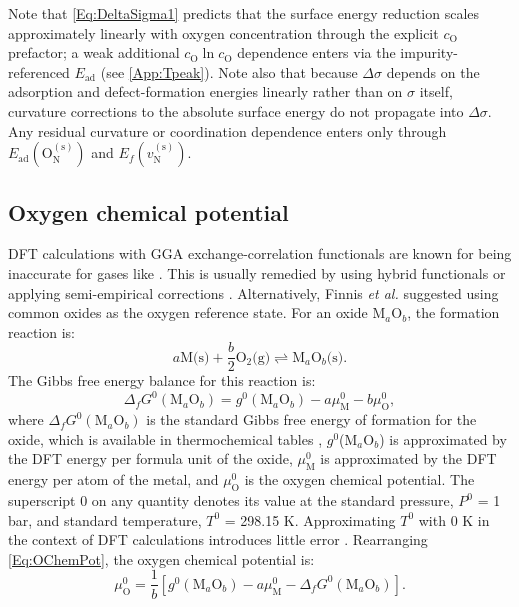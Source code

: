 \documentclass[preprint,12pt,sort&compress]{elsarticle}
\newcommand{\?}{\stackrel{?}{=}}
\begin{document}
Note that \cref{Eq:DeltaSigma1} predicts that the surface energy reduction scales approximately linearly with oxygen concentration through the explicit $c_\text{O}$ prefactor; a weak additional $c_\text{O}\ln c_\text{O}$ dependence enters via the impurity-referenced $E_\text{ad}$ (see \ref{App:Tpeak}). Note also that because $\Delta \sigma$ depends on the adsorption and defect-formation energies linearly rather than on $\sigma$ itself, curvature corrections to the absolute surface energy do not propagate into $\Delta \sigma$. Any residual curvature or coordination dependence enters only through $E_\text{ad}(\text{O}_\text{N}^{(\text{s})})$ and $E_f(v_\text{N}^{(\text{s})})$.

\subsection{Oxygen chemical potential}
\label{Sec:uO}

DFT calculations with GGA exchange-correlation functionals are known for being inaccurate for gases like  \cite{Bocharov2013}. This is usually remedied by using hybrid functionals or applying semi-empirical corrections \cite{Sargeant2021}. Alternatively, Finnis \textit{et al.} \cite{Finnis2005} suggested using common oxides as the oxygen reference state. For an oxide M$_a$O$_b$, the formation reaction is:
\begin{equation}
a \text{M(s)} + \frac{b}{2} \text{O$_2$(g)} \rightleftharpoons \text{M$_a$O$_b$(s)}.
\end{equation}
The Gibbs free energy balance for this reaction is:
\begin{equation}
\Delta_f G^0 (\text{M$_a$O$_b$}) = g^0(\text{M$_a$O$_b$}) - a \mu_\text{M}^0 - b \mu_\text{O}^0,
\label{Eq:OChemPot}
\end{equation}
where $\Delta_f G^0 (\text{M$_a$O$_b$})$ is the standard Gibbs free energy of formation for the oxide, which is available in thermochemical tables \cite{Linstrom2024}, $g^0$(M$_a$O$_b$) is approximated by the DFT energy per formula unit of the oxide, $\mu_\text{M}^0$ is approximated by the DFT energy per atom of the metal, and $\mu_\text{O}^0$ is the oxygen chemical potential. The superscript 0 on any quantity denotes its value at the standard pressure, $P^0$ = 1 bar, and standard temperature, $T^0$ = 298.15 K. Approximating $T^0$ with 0 K in the context of DFT calculations introduces little error \cite{Finnis2005}. Rearranging \cref{Eq:OChemPot}, the oxygen chemical potential is:
\begin{equation}
\mu_\text{O}^0 = \frac{1}{b} \left[ g^0(\text{M$_a$O$_b$}) - a \mu_\text{M}^0 - \Delta_f G^0 (\text{M$_a$O$_b$}) \right].
\label{Eq:OxidePot}
\end{equation}
\end{document}
